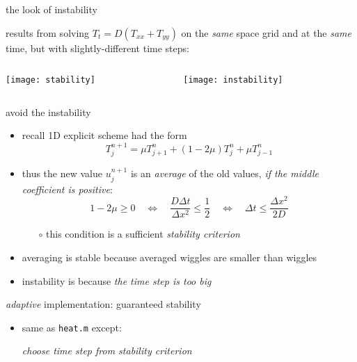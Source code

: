 \begin{frame}{the look of instability}

results from solving $T_t = D(T_{xx} + T_{yy})$ on the \emph{same} space grid and at the \emph{same} time, but with slightly-different time steps:

\bigskip
\begin{columns}
\begin{column}{0.5\textwidth}
\begin{center}
\texttt{[image: stability]}

\end{center}
\end{column}
\begin{column}{0.5\textwidth}
\begin{center}
\texttt{[image: instability]}

\end{center}
\end{column}
\end{columns}
\end{frame}


\begin{frame}{avoid the instability}
\label{slide:maxprinc}

\begin{itemize}
\item recall 1D explicit scheme had the form 
	$$T_j^{n+1} = \mu T_{j+1}^n + (1 - 2 \mu) T_j^n + \mu T_{j-1}^n$$
\item thus the new value $u_j^{n+1}$ is an \emph{average} of the old values, \emph{if the middle coefficient is positive}:
	$$1 - 2 \mu \ge 0 \quad \iff \quad  \frac{D\Delta t}{\Delta x^2} \le \frac{1}{2} \quad \iff \quad \Delta t \le \frac{\Delta x^2}{2 D}$$
    \begin{itemize}
    \item[$\circ$] this condition is a sufficient \emph{stability criterion}
    \end{itemize}
\item averaging is stable because averaged wiggles are smaller than wiggles
\item instability is because \emph{the time step is too big}
\end{itemize}
\end{frame}


\begin{frame}{\textsl{adaptive} implementation: guaranteed stability}


\begin{itemize}
\item same as \texttt{heat.m} except:

\begin{center}
\emph{choose time step from stability criterion}
\end{center}
\end{itemize}\end{frame}



